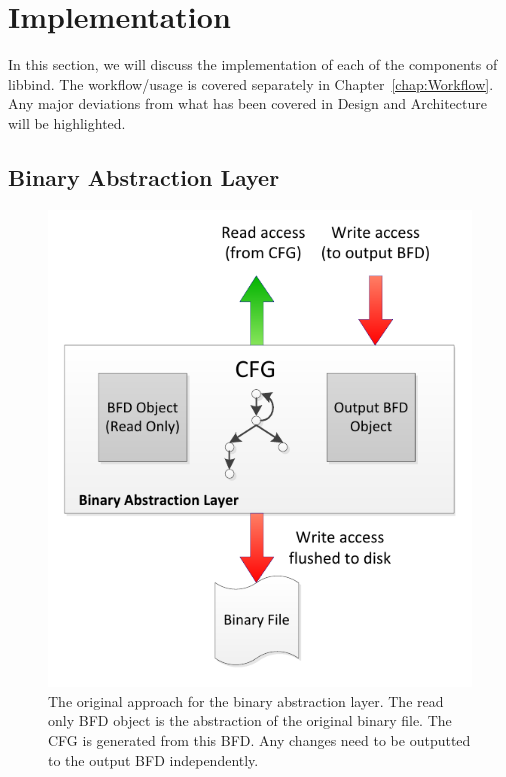 \chapter{Implementation}\label{chap:Implementation}

In this section, we will discuss the implementation of each of the components of libbind. The workflow/usage is covered separately in Chapter~\ref{chap:Workflow}. Any major deviations from what has been covered in Design and Architecture will be highlighted.

\section{Binary Abstraction Layer}

\begin{figure}[H]
 \centering
 \includegraphics{Binary_Abstraction_Layer_Attempt1.pdf}
 \caption{The original approach for the binary abstraction layer. The read only BFD object is the abstraction of the original binary file. The CFG is generated from this BFD. Any changes need to be outputted to the output BFD independently.}
\label{fig:BAL_Attempt1}
\end{figure}

